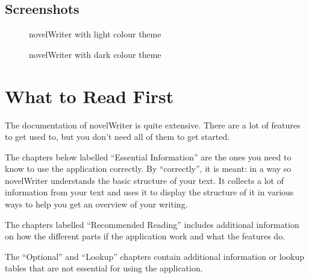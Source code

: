\documentclass[a4paper,11pt,english]{sphinxmanual}
\begin{document}
\section{Screenshots}
\label{\detokenize{int_introduction:screenshots}}\label{\detokenize{int_introduction:a-intro-screenshots}}
\begin{figure}[htbp]
\centering
\capstart

\noindent{}
\caption{novelWriter with light colour theme}\label{\detokenize{int_introduction:id1}}\end{figure}

\begin{figure}[htbp]
\centering
\capstart

\noindent{}
\caption{novelWriter with dark colour theme}\label{\detokenize{int_introduction:id2}}\end{figure}

\sphinxstepscope


\chapter{What to Read First}
\label{\detokenize{int_overview:what-to-read-first}}\label{\detokenize{int_overview:a-reading}}\label{\detokenize{int_overview::doc}}
\sphinxAtStartPar
The documentation of novelWriter is quite extensive. There are a lot of features to get used to,
but you don’t need all of them to get started.

\sphinxAtStartPar
The chapters below labelled “Essential Information” are the ones you need to know to use the
application correctly. By “correctly”, it is meant: in a way so novelWriter understands the basic
structure of your text. It collects a lot of information from your text and uses it to display the
structure of it in various ways to help you get an overview of your writing.

\sphinxAtStartPar
The chapters labelled “Recommended Reading” includes additional information on how the different
parts if the application work and what the features do.

\sphinxAtStartPar
The “Optional” and “Lookup” chapters contain additional information or lookup tables that are not
essential for using the application.
\end{document}
